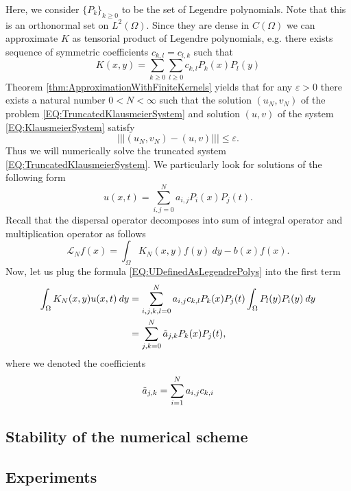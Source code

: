 \documentclass[12pt, a4paper]{article}
\theoremstyle{break}
\theoremstyle{break}
\theoremstyle{break}
\theoremstyle{break}
\theoremstyle{break}
\theoremstyle{break}
\theoremstyle{break}
\begin{document}
Here, we consider $\{ P_k \}_{k \geq 0}$ to be the set of Legendre polynomials. Note that this is an orthonormal set on $L^2(\Omega)$. Since they are dense in $C(\Omega)$ we can approximate $K$ as tensorial product of Legendre polynomials, e.g. there exists sequence of symmetric coefficients $c_{k,l} = c_{l, k}$ such that
\begin{equation}
    K(x, y) = \sum_{k \geq 0} \sum_{l \geq 0} c_{k, l} P_k(x) P_l(y)
\end{equation}
Theorem \ref{thm:ApproximationWithFiniteKernels} yields that for any $\varepsilon > 0$ there exists a natural number $0 < N < \infty$ such that the solution $(u_N, v_N)$ of the problem \eqref{EQ:TruncatedKlausmeierSystem} and solution $(u, v)$ of the system \eqref{EQ:KlausmeierSystem} satisfy
\begin{equation}
    |||(u_N, v_N) - (u, v)||| \leq \varepsilon.
\end{equation}
Thus we will numerically solve the truncated system \eqref{EQ:TruncatedKlausmeierSystem}. We particularly look for solutions of the following form
\begin{equation}
    \label{EQ:UDefinedAsLegendrePolys}
    u(x, t) = \sum_{i, j = 0}^N a_{i, j} P_i(x) P_j(t).
\end{equation}
Recall that the dispersal operator decomposes into sum of integral operator and multiplication operator as follows
\begin{equation}
    \mathcal{L}_N f(x) = \int_\Omega K_N(x,y) f(y)\:dy - b(x) f(x).
\end{equation}
Now, let us plug the formula \eqref{EQ:UDefinedAsLegendrePolys} into the first term
\begin{align*}
    \int_\Omega K_N(x,y) u(x,t) \:dy
    &= \sum_{i, j, k, l = 0}^N a_{i, j} c_{k, l} P_k(x) P_j(t) \int_\Omega P_l(y) P_i(y) \:dy \\
    &= \sum_{j, k = 0}^N \Tilde{a}_{j, k} P_k(x) P_j(t),
\end{align*}
where we denoted the coefficients
\begin{equation*}
    \Tilde{a}_{j ,k} = \sum_{i=1}^N a_{i, j} c_{k, i}
\end{equation*}
\subsection{Stability of the numerical scheme}

\subsection{Experiments}

\newpage





\end{document}
